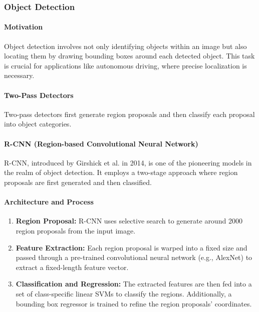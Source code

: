 \documentclass[12pt]{article}
\begin{document}
\subsubsection{Object Detection}

\paragraph{Motivation}
Object detection involves not only identifying objects within an image but also locating them by drawing bounding boxes around each detected object. This task is crucial for applications like autonomous driving, where precise localization is necessary.

\paragraph{Two-Pass Detectors}

Two-pass detectors first generate region proposals and then classify each proposal into object categories.

\paragraph{R-CNN (Region-based Convolutional Neural Network)}

R-CNN, introduced by Girshick et al. in 2014, is one of the pioneering models in the realm of object detection. It employs a two-stage approach where region proposals are first generated and then classified.

\paragraph{Architecture and Process}

\begin{enumerate}
    \item \textbf{Region Proposal:} R-CNN uses selective search to generate around 2000 region proposals from the input image.
    
    \item \textbf{Feature Extraction:} Each region proposal is warped into a fixed size and passed through a pre-trained convolutional neural network (e.g., AlexNet) to extract a fixed-length feature vector.

    \item \textbf{Classification and Regression:} The extracted features are then fed into a set of class-specific linear SVMs to classify the regions. Additionally, a bounding box regressor is trained to refine the region proposals' coordinates.
\end{enumerate}
\end{document}
